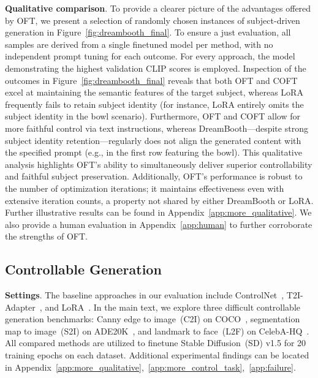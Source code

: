 \textbf{Qualitative comparison}. To provide a clearer picture of the advantages offered by OFT, we present a selection of randomly chosen instances of subject-driven generation in Figure~\ref{fig:dreambooth_final}. To ensure a just evaluation, all samples are derived from a single finetuned model per method, with no independent prompt tuning for each outcome. For every approach, the model demonstrating the highest validation CLIP scores is employed. Inspection of the outcomes in Figure~\ref{fig:dreambooth_final} reveals that both OFT and COFT excel at maintaining the semantic features of the target subject, whereas LoRA frequently fails to retain subject identity (for instance, LoRA entirely omits the subject identity in the bowl scenario). Furthermore, OFT and COFT allow for more faithful control via text instructions, whereas DreamBooth—despite strong subject identity retention—regularly does not align the generated content with the specified prompt (e.g., in the first row featuring the bowl). This qualitative analysis highlights OFT's ability to simultaneously deliver superior controllability and faithful subject preservation. Additionally, OFT's performance is robust to the number of optimization iterations; it maintains effectiveness even with extensive iteration counts, a property not shared by either DreamBooth or LoRA. Further illustrative results can be found in Appendix~\ref{app:more_qualitative}. We also provide a human evaluation in Appendix~\ref{app:human} to further corroborate the strengths of OFT.

\subsection{Controllable Generation}

\textbf{Settings}. The baseline approaches in our evaluation include ControlNet~\cite{zhang2023adding}, T2I-Adapter~\cite{mou2023t2i}, and LoRA~\cite{hulora2022}. In the main text, we explore three difficult controllable generation benchmarks: Canny edge to image~(C2I) on COCO~\cite{lin2014microsoft}, segmentation map to image~(S2I) on ADE20K~\cite{zhou2017scene}, and landmark to face~(L2F) on CelebA-HQ~\cite{karras2018progressive,xia2021tedigan}. All compared methods are utilized to finetune Stable Diffusion~(SD) v1.5 for 20 training epochs on each dataset. Additional experimental findings can be located in Appendix~\ref{app:more_qualitative},~\ref{app:more_control_task},~\ref{app:failure}.

